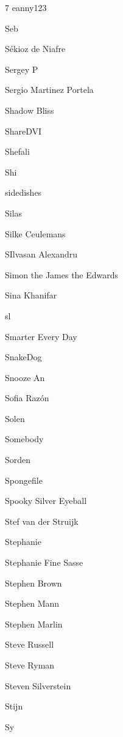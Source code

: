 \documentclass[11pt]{article}
\begin{document}
{\begin{multicols}{7}
eanny123 \par Seb \par Sékioz de Niafre \par Sergey P \par Sergio Martinez Portela \par Shadow Bliss \par ShareDVI \par Shefali \par Shi \par sidedishes \par Silas \par Silke Ceulemans \par SIlvasan Alexandru \par Simon the James the Edwards \par Sina Khanifar \par sl \par Smarter Every Day \par SnakeDog \par Snooze An \par Sofia Razón \par Solen \par Somebody \par Sorden \par Spongefile \par Spooky Silver Eyeball \par Stef van der Struijk \par Stephanie \par Stephanie Fine Sasse \par Stephen Brown \par Stephen Mann \par Stephen Marlin \par Steve Russell \par Steve Ryman \par Steven Silverstein \par Stijn \par Sy
\end{multicols}}
\end{document}
